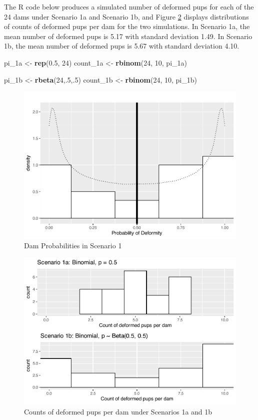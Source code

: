 \documentclass[
]{krantz}
\newenvironment{Shaded}{\begin{snugshade}}{\end{snugshade}}
\newcommand{\DecValTok}[1]{\textcolor[rgb]{0.06,0.06,0.06}{#1}}
\newcommand{\FloatTok}[1]{\textcolor[rgb]{0.06,0.06,0.06}{#1}}
\newcommand{\KeywordTok}[1]{\textcolor[rgb]{0.27,0.27,0.27}{\textbf{#1}}}
\newcommand{\NormalTok}[1]{#1}
\newcommand{\StringTok}[1]{\textcolor[rgb]{0.5,0.5,0.5}{#1}}
\begin{document}
The R code below produces a simulated number of deformed pups for each of the 24 dams under Scenario 1a and Scenario 1b, and Figure \ref{fig:scenario1Plot} displays distributions of counts of deformed pups per dam for the two simulations. In Scenario 1a, the mean number of deformed pups is 5.17 with standard deviation 1.49. In Scenario 1b, the mean number of deformed pups is 5.67 with standard deviation 4.10.

\begin{Shaded}
\begin{Highlighting}[]
\NormalTok{pi_1a <-}\StringTok{ }\KeywordTok{rep}\NormalTok{(}\FloatTok{0.5}\NormalTok{, }\DecValTok{24}\NormalTok{)}
\NormalTok{count_1a <-}\StringTok{ }\KeywordTok{rbinom}\NormalTok{(}\DecValTok{24}\NormalTok{, }\DecValTok{10}\NormalTok{, pi_1a)}

\NormalTok{pi_1b <-}\StringTok{ }\KeywordTok{rbeta}\NormalTok{(}\DecValTok{24}\NormalTok{,.}\DecValTok{5}\NormalTok{,.}\DecValTok{5}\NormalTok{)  }
\NormalTok{count_1b <-}\StringTok{ }\KeywordTok{rbinom}\NormalTok{(}\DecValTok{24}\NormalTok{, }\DecValTok{10}\NormalTok{, pi_1b)  }
\end{Highlighting}
\end{Shaded}

\begin{figure}

{\centering \includegraphics[width=0.6\linewidth]{bookdown-BeyondMLR_files/figure-latex/scenario1ProbabilityPlot-1} 

}

\caption{Dam Probabilities in Scenario 1}\label{fig:scenario1ProbabilityPlot}
\end{figure}

\begin{figure}

{\centering \includegraphics[width=0.6\linewidth]{bookdown-BeyondMLR_files/figure-latex/scenario1Plot-1} 

}

\caption{Counts of deformed pups per dam under Scenarios 1a and 1b}\label{fig:scenario1Plot}
\end{figure}
\end{document}
